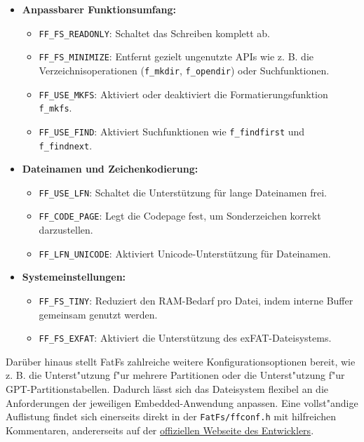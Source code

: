 \documentclass[11pt]{article}
\begin{document}
\begin{itemize}
    \item \textbf{Anpassbarer Funktionsumfang:}
    \begin{itemize}
        \item \texttt{FF\_FS\_READONLY}: Schaltet das Schreiben komplett ab.
        \item \texttt{FF\_FS\_MINIMIZE}: Entfernt gezielt ungenutzte APIs wie z. B. die Verzeichnisoperationen (\texttt{f\_mkdir}, \texttt{f\_opendir}) oder Suchfunktionen.
        \item \texttt{FF\_USE\_MKFS}: Aktiviert oder deaktiviert die Formatierungsfunktion \texttt{f\_mkfs}.
        \item \texttt{FF\_USE\_FIND}: Aktiviert Suchfunktionen wie \texttt{f\_findfirst} und \texttt{f\_findnext}.
    \end{itemize}
    
    \item \textbf{Dateinamen und Zeichenkodierung:}
    \begin{itemize}
        \item \texttt{FF\_USE\_LFN}: Schaltet die Unterstützung für lange Dateinamen frei.
        \item \texttt{FF\_CODE\_PAGE}: Legt die Codepage fest, um Sonderzeichen korrekt darzustellen.
        \item \texttt{FF\_LFN\_UNICODE}: Aktiviert Unicode-Unterstützung für Dateinamen.
    \end{itemize}
    
    \item \textbf{Systemeinstellungen:}
    \begin{itemize}
        \item \texttt{FF\_FS\_TINY}: Reduziert den RAM-Bedarf pro Datei, indem interne Buffer gemeinsam genutzt werden.
        \item \texttt{FF\_FS\_EXFAT}: Aktiviert die Unterstützung des exFAT-Dateisystems.
    \end{itemize}
\end{itemize}

Darüber hinaus stellt FatFs zahlreiche weitere Konfigurationsoptionen bereit, wie z. B. die Unterst"utzung 
f"ur mehrere Partitionen oder die Unterst"utzung f"ur GPT-Partitionstabellen.
Dadurch lässt sich das Dateisystem flexibel an die Anforderungen der jeweiligen
Embedded-Anwendung anpassen.
Eine vollst"andige Auflistung findet sich einerseits direkt in der \texttt{FatFs/ffconf.h} mit hilfreichen Kommentaren,
andererseits auf der \href{https://elm-chan.org/fsw/ff/doc/config.html}{offiziellen Webseite des Entwicklers}.
\end{document}
